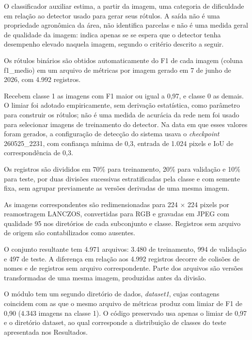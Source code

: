 O classificador auxiliar estima, a partir da imagem, uma categoria de dificuldade em rela\c{c}\~ao ao detector usado para gerar seus r\'otulos. A sa\'ida n\~ao \'e uma propriedade agron\^omica da \'area, n\~ao identifica parcelas e n\~ao \'e uma medida geral de qualidade da imagem: indica apenas se se espera que o detector tenha desempenho elevado naquela imagem, segundo o crit\'erio descrito a seguir.

Os r\'otulos bin\'arios s\~ao obtidos automaticamente do F1 de cada imagem (coluna f1\_medio) em um arquivo de m\'etricas por imagem gerado em 7 de junho de 2026, com 4.992 registros.

Recebem classe 1 as imagens com F1 maior ou igual a 0,97, e classe 0 as demais. O limiar foi adotado empiricamente, sem deriva\c{c}\~ao estat\'istica, como par\^ametro para construir os r\'otulos; n\~ao \'e uma medida de acur\'acia da rede nem foi usado para selecionar imagens de treinamento do detector. Na data em que esses valores foram gerados, a configura\c{c}\~ao de detec\c{c}\~ao do sistema usava o \textit{checkpoint} 260525\_2231, com confian\c{c}a m\'inima de 0,3, entrada de 1.024 pixels e IoU de correspond\^encia de 0,3.

Os registros s\~ao divididos em 70\% para treinamento, 20\% para valida\c{c}\~ao e 10\% para teste, por duas divis\~oes sucessivas estratificadas pela classe e com semente fixa, sem agrupar previamente as vers\~oes derivadas de uma mesma imagem.

As imagens correspondentes s\~ao redimensionadas para 224 $\times$ 224 pixels por reamostragem LANCZOS, convertidas para RGB e gravadas em JPEG com qualidade 95 nos diret\'orios de cada subconjunto e classe. Registros sem arquivo de origem s\~ao contabilizados como ausentes.

O conjunto resultante tem 4.971 arquivos: 3.480 de treinamento, 994 de valida\c{c}\~ao e 497 de teste. A diferen\c{c}a em rela\c{c}\~ao aos 4.992 registros decorre de colis\~oes de nomes e de registros sem arquivo correspondente. Parte dos arquivos s\~ao vers\~oes transformadas de uma mesma imagem, produzidas antes da divis\~ao.

O m\'odulo tem um segundo diret\'orio de dados, \textit{dataset1}, cujas contagens coincidem com as que o mesmo arquivo de m\'etricas produz com limiar de F1 de 0,90 (4.343 imagens na classe 1). O c\'odigo preservado usa apenas o limiar de 0,97 e o diret\'orio dataset, ao qual corresponde a distribui\c{c}\~ao de classes do teste apresentada nos Resultados.

